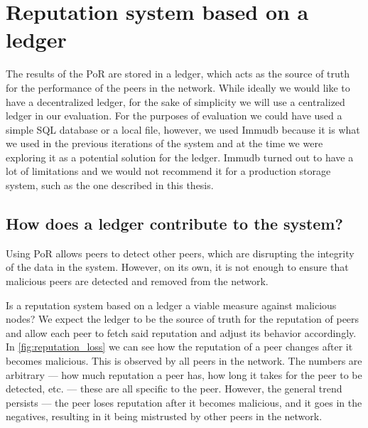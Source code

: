 
\section{Reputation system based on a ledger}

The results of the PoR are stored in a ledger, which acts as the source of truth for
the performance of the peers in the network.
While ideally we would like to have a decentralized ledger, for the sake of simplicity
we will use a centralized ledger in our evaluation.
For the purposes of evaluation we could have used a simple SQL database or a local file,
however, we used Immudb because it is what we used in the previous iterations of the system
and at the time we were exploring it as a potential solution for the ledger.
Immudb turned out to have a lot of limitations and we would not recommend it for a production storage system,
such as the one described in this thesis.

\subsection{How does a ledger contribute to the system?}

Using PoR allows peers to detect other peers, which are disrupting the integrity of the data in the system.
However, on its own, it is not enough to ensure that malicious peers are detected and removed from the network.

Is a reputation system based on a ledger a viable measure against malicious nodes?
We expect the ledger to be the source of truth for the reputation of peers and allow
each peer to fetch said reputation and adjust its behavior accordingly.
In \autoref{fig:reputation_loss} we can see how the reputation of a peer changes after it becomes malicious.
This is observed by all peers in the network.
The numbers are arbitrary --- how much reputation a peer has, how long it takes for the peer to be detected,
etc. --- these are all specific to the peer.
However, the general trend persists --- the peer loses reputation after it becomes malicious,
and it goes in the negatives, resulting in it being mistrusted by other peers in the network.

